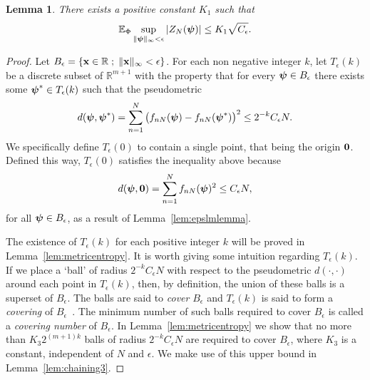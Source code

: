\documentclass[aap]{imsart}
\newcommand{\reals}{{\mathbb R}}
\newcommand{\expect}{{\mathbb E}}
\renewcommand{\mid}{\; ; \;}
\newcommand{\abs}[1]{\left\vert #1 \right\vert}
\newtheorem{lemma}{Lemma}
\begin{document}
\begin{lemma}\label{lem:chaining2}
There exists a positive constant $K_1$ such that
\[
\expect_\Phi \sup_{\|\psibf\|_{\infty} < \epsilon} \abs{ Z_N(\psibf) } \leq K_1 \sqrt{C_\epsilon}.
\]
\end{lemma}
\begin{proof}
Let $B_\epsilon = \{\xbf \in \reals \mid \|\xbf\|_\infty < \epsilon \}$.
For each non negative integer $k$, let $T_\epsilon(k)$ be a discrete subset of $\reals^{m+1}$ with the property that for every $\boldsymbol{\psi} \in B_\epsilon$ there exists some $\boldsymbol{\psi}^* \in T_\epsilon(k)$ such that the pseudometric
\[
d(\boldsymbol{\psi}, \boldsymbol{\psi}^*) = \sum_{n = 1}^N \big( f_{nN}(\boldsymbol{\psi}) - f_{nN}(\boldsymbol{\psi}^*) \big)^2 \leq 2^{-k} C_\epsilon N.
\]
We specifically define $T_\epsilon(0)$ to contain a single point, that being the origin $\boldsymbol{0}$.  Defined this way, $T_\epsilon(0)$ satisfies the inequality above because
\[
d(\boldsymbol{\psi}, \boldsymbol{0}) = \sum_{n = 1}^N f_{nN}(\boldsymbol{\psi})^2  \leq C_\epsilon N ,
\]
for all $\boldsymbol{\psi} \in B_\epsilon$, as a result of Lemma~\ref{lem:epslmlemma}.

The existence of $T_\epsilon(k)$ for each positive integer $k$ will be proved in Lemma~\ref{lem:metricentropy}.  It is worth giving some intuition regarding $T_\epsilon(k)$.  If we place a `ball' of radius $2^{-k} C_\epsilon N$  with respect to the pseudometric $d(\cdot, \cdot)$ around each point in $T_\epsilon(k)$, then, by definition, the union of these balls is a superset of $B_\epsilon$.  The balls are said to \emph{cover} $B_\epsilon$ and $T_\epsilon(k)$ is said to form a \emph{covering} of $B_\epsilon$~\cite[Section 1.2]{Dudley_unif_central_lim_th_1999}.  The minimum number of such balls required to cover $B_\epsilon$ is called a \emph{covering number} of $B_\epsilon$.  In Lemma~\ref{lem:metricentropy} we show that no more than $K_3 2^{(m+1)k}$ balls of radius $2^{-k} C_\epsilon N$ are required to cover $B_\epsilon$, where $K_3$ is a constant, independent of $N$ and $\epsilon$.  We make use of this upper bound in Lemma~\ref{lem:chaining3}.


\end{proof}
\end{document}

